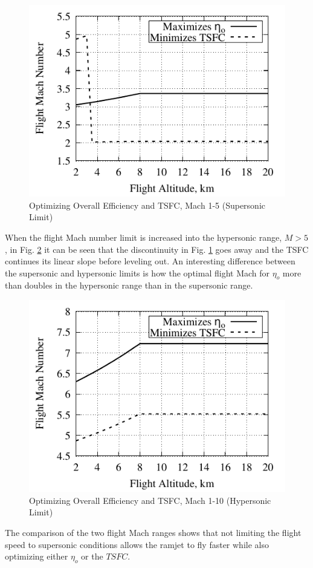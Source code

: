 \documentclass[conf]{new-aiaa} %
\begin{document}
\begin{figure}[H] %
    \centering
    \includegraphics[]{media/performance_parameter_files/part_e_range_1_5.pdf}
    \caption{\label{fig:parte1-5}Optimizing Overall Efficiency and TSFC, Mach 1-5 (Supersonic Limit)}
\end{figure}
When the flight Mach number limit is increased into the hypersonic range, $M>5$, in Fig. \ref{fig:parte1-10} it can be seen that the discontinuity in Fig. \ref{fig:parte1-5} goes away and the TSFC continues its linear slope before leveling out. An interesting difference between the supersonic and hypersonic limits is how the optimal flight Mach for $\eta_o$ more than doubles in the hypersonic range than in the supersonic range.

\begin{figure}[H] %
    \centering
    \includegraphics[]{media/performance_parameter_files/part_e_range_1_10.pdf}
    \caption{\label{fig:parte1-10}Optimizing Overall Efficiency and TSFC, Mach 1-10 (Hypersonic Limit)}
\end{figure}
The comparison of the two flight Mach ranges shows that not limiting the flight speed to supersonic conditions allows the ramjet to fly faster while also optimizing either $\eta_o$ or the $TSFC$.
\end{document}
